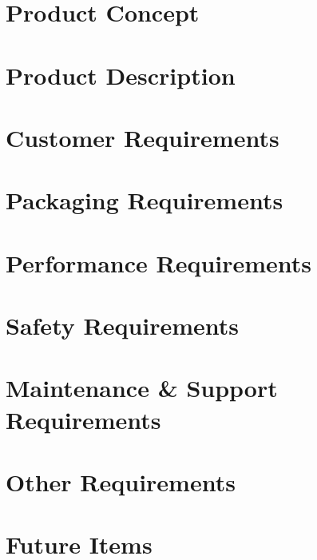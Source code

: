 \documentclass[11pt,letterpaper]{article}
\begin{document}
\listoffigures
\newpage

\section{Product Concept}

\newpage
\section{Product Description}

\newpage
\section{Customer Requirements}

\newpage
\section{Packaging Requirements}

\newpage
\section{Performance Requirements}

\newpage
\section{Safety Requirements}

\newpage
\section{Maintenance \& Support Requirements}

\newpage
\section{Other Requirements}

\newpage
\section{Future Items}

\newpage



{}
\end{document}
